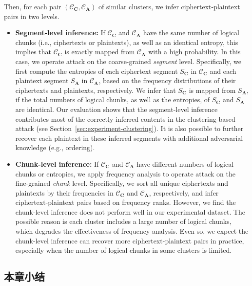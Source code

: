 Then, for each pair $(\mathcal{C}_\mathbf{C}, \mathcal{C}_\mathbf{A})$ of similar clusters, we infer ciphertext-plaintext pairs in two levels. 
\begin{itemize}[leftmargin=*]
    \item {\bf Segment-level inference:}
        If $\mathcal{C}_\mathbf{C}$ and $\mathcal{C}_\mathbf{A}$ have the same number of logical chunks (i.e., ciphertexts or plaintexts), as well as an identical entropy, this implies that $\mathcal{C}_\mathbf{C}$ is exactly mapped from $\mathcal{C}_\mathbf{A}$ with a high probability. In this case, we operate attack on the coarse-grained {\em segment} level. Specifically, we first compute the entropies of each ciphertext segment $S_\mathbf{C}$ in $\mathcal{C}_\mathbf{C}$ and each plaintext segment $S_\mathbf{A}$ in $\mathcal{C}_\mathbf{A}$, based on the frequency distributions of their ciphertexts and plaintexts, respectively. 
         We infer that $S_\mathbf{C}$ is mapped from  $S_\mathbf{A}$, if the total numbers of logical chunks, as well as the entropies, of $S_\mathbf{C}$ and $S_\mathbf{A}$ are identical. Our evaluation shows that the segment-level inference contributes most of the correctly inferred contents in the
        clustering-based attack (see
        Section~\ref{sec:experiment-clustering}). It is also possible to further recover each plaintext in these inferred segments with additional adversarial knowledge (e.g., ordering). 
    \item {\bf Chunk-level inference:}
        If $\mathcal{C}_\mathbf{C}$ and $\mathcal{C}_\mathbf{A}$ have different numbers of logical chunks or entropies, we apply frequency analysis to operate attack on the fine-grained {\em chunk} level. Specifically, we sort all unique ciphertexts and plaintexts by their frequencies in $\mathcal{C}_\mathbf{C}$ and $\mathcal{C}_\mathbf{A}$, respectively, and infer ciphertext-plaintext pairs based on frequency ranks.  
        However, we find the chunk-level inference does not perform well in our experimental dataset. The possible reason is each cluster includes a large number of logical chunks, which degrades the effectiveness of  frequency analysis. Even so, we expect the chunk-level inference can recover more ciphertext-plaintext pairs in practice, especially when the number of logical chunks in some clusters is limited.   
\end{itemize}

\subsection{本章小结}

